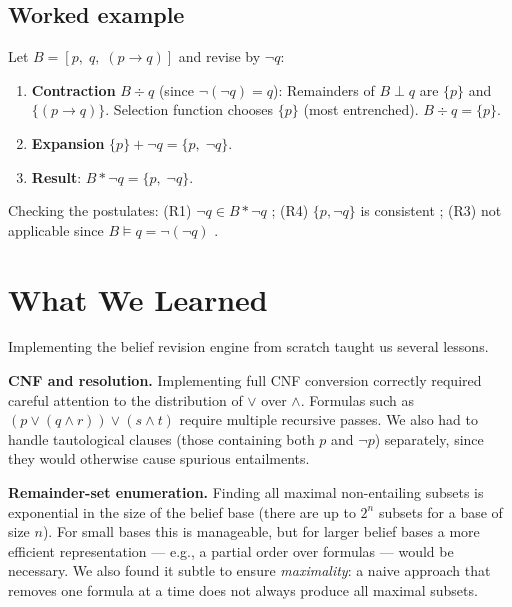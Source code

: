 \documentclass[11pt,a4paper]{article}
\newcommand{\entails}{\models}
\newcommand{\contraction}{\mathbin{\div}}
\newcommand{\revision}{\mathbin{*}}
\newcommand{\expansion}{\mathbin{+}}
\newcommand{\lneg}{\neg}
\begin{document}
\subsection{Worked example}

Let $B = [p,\; q,\; (p \to q)]$ and revise by $\lneg q$:

\begin{enumerate}[noitemsep]
  \item \textbf{Contraction} $B \contraction q$ (since $\lneg(\lneg q) = q$):
        Remainders of $B \perp q$ are $\{p\}$ and $\{(p\to q)\}$.
        Selection function chooses $\{p\}$ (most entrenched).
        $B \contraction q = \{p\}$.
  \item \textbf{Expansion} $\{p\} \expansion \lneg q = \{p,\; \lneg q\}$.
  \item \textbf{Result}: $B \revision \lneg q = \{p,\; \lneg q\}$.
\end{enumerate}

Checking the postulates:
(R1) $\lneg q \in B \revision \lneg q$ \checkmark;\quad
(R4) $\{p, \lneg q\}$ is consistent \checkmark;\quad
(R3) not applicable since $B \entails q = \lneg(\lneg q)$ \checkmark.

\section{What We Learned}

Implementing the belief revision engine from scratch taught us several lessons.

\textbf{CNF and resolution.}
Implementing full CNF conversion correctly required careful attention to the
distribution of $\lor$ over $\land$.  Formulas such as
$(p \lor (q \land r)) \lor (s \land t)$ require multiple recursive passes.
We also had to handle tautological clauses (those containing both $p$ and
$\lneg p$) separately, since they would otherwise cause spurious entailments.

\textbf{Remainder-set enumeration.}
Finding all maximal non-entailing subsets is exponential in the size of the
belief base (there are up to $2^n$ subsets for a base of size $n$).
For small bases this is manageable, but for larger belief bases a more
efficient representation — e.g., a partial order over formulas — would be
necessary.  We also found it subtle to ensure \emph{maximality}: a naive
approach that removes one formula at a time does not always produce all
maximal subsets.
\end{document}
